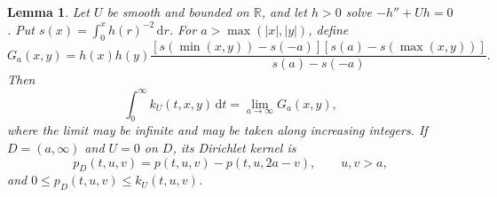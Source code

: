 \documentclass[11pt,a4paper]{article}
\newtheorem{lemma}[theorem]{Lemma}
\newcommand{\R}{\mathbb R}
\newcommand{\dd}{\,\mathrm d}
\begin{document}
\begin{lemma}\label{lem:green}
Let $U$ be smooth and bounded on $\R$, and let $h>0$ solve $-h''+Uh=0$.
Put $s(x)=\int_0^x h(r)^{-2}\dd r$. For $a>\max(|x|,|y|)$, define
\begin{equation}\label{eq:green}
 G_a(x,y)=h(x)h(y)
 \frac{[s(\min(x,y))-s(-a)]
       [s(a)-s(\max(x,y))]}{s(a)-s(-a)}.
\end{equation}
Then
\begin{equation}\label{eq:green-exhaustion}
 \int_0^\infty k_U(t,x,y)\dd t
    =\lim_{a\to\infty}G_a(x,y),
\end{equation}
where the limit may be infinite and may be taken along increasing integers.
If $D=(a,\infty)$ and $U=0$ on $D$, its Dirichlet kernel is
\begin{equation}\label{eq:image}
 p_D(t,u,v)=p(t,u,v)-p(t,u,2a-v),\qquad u,v>a,
\end{equation}
and $0\leq p_D(t,u,v)\leq k_U(t,u,v)$.
\end{lemma}
\end{document}

